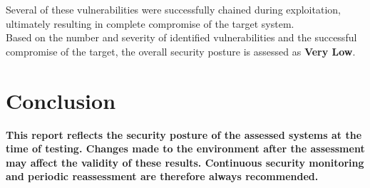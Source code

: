 Several of these vulnerabilities were successfully chained during exploitation, ultimately resulting in complete compromise of the target system.
\\

Based on the number and severity of identified vulnerabilities and the successful compromise of the target, the overall security posture is assessed as \textbf{Very Low}.

\section{Conclusion}
\textbf{This report reflects the security posture of the assessed systems at the time of testing. Changes made to the environment after the assessment may affect the validity of these results. Continuous security monitoring and periodic reassessment are therefore always recommended.}